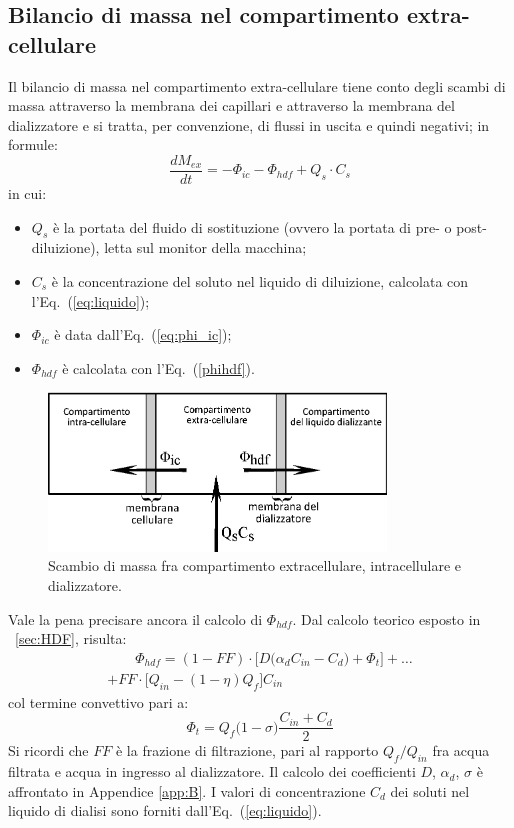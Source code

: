 \subsection{Bilancio di massa nel compartimento extra-cellulare}
Il bilancio di massa nel compartimento extra-cellulare tiene conto degli scambi di massa attraverso la membrana dei capillari e attraverso la membrana del dializzatore e si tratta, per convenzione, di flussi in uscita e quindi negativi; in formule:
\begin{equation}
	\frac{dM_{ex}}{dt} = -\Phi_{ic} -\Phi_{hdf} + Q_s\cdot C_s
\end{equation}
in cui:
\begin{itemize}
	\item $Q_s$ è la portata del fluido di sostituzione (ovvero la portata di pre- o post-diluizione), letta sul monitor della macchina;
	\item $C_s$ è la concentrazione del soluto nel liquido di diluizione, calcolata con l'Eq.~(\ref{eq:liquido});
	\item $\Phi_{ic}$ è data dall'Eq.~(\ref{eq:phi_ic});
	\item $\Phi_{hdf}$ è calcolata con l'Eq.~(\ref{phihdf}).	
\end{itemize}
\begin{figure}[htb]
	\centering
		\includegraphics[width=0.8\textwidth]{immagini/massa_ex.eps}
				\caption{Scambio di massa fra compartimento extracellulare, intracellulare e dializzatore.}
\end{figure}
Vale la pena precisare ancora il calcolo di $\Phi_{hdf}$. Dal calcolo teorico esposto in \textsection~\ref{sec:HDF}, risulta:
\begin{multline}\label{eq:phihdf}
		\qquad \Phi_{hdf} = (1-FF)\cdot \biggl[D\bigl(\alpha_d C_{in} - C_d\bigr)+\Phi_t \biggr] + \ldots \\
		                 + FF\cdot \biggl[Q_{in}-(1-\eta)Q_f\biggr] C_{in} \qquad
\end{multline}
col termine convettivo pari a:
\begin{equation*}
	\Phi_t = Q_f \bigl(1-\sigma\bigr) \frac{C_{in} + C_d}{2}
\end{equation*}
Si ricordi che $FF$ è la frazione di filtrazione, pari al rapporto $Q_f/Q_{in}$ fra acqua filtrata e acqua in ingresso al dializzatore. Il calcolo dei coefficienti $D$, $\alpha_d$, $\sigma$ è affrontato in Appendice \ref{app:B}. I valori di concentrazione $C_d$ dei soluti nel liquido di dialisi sono forniti dall'Eq.~(\ref{eq:liquido}).

